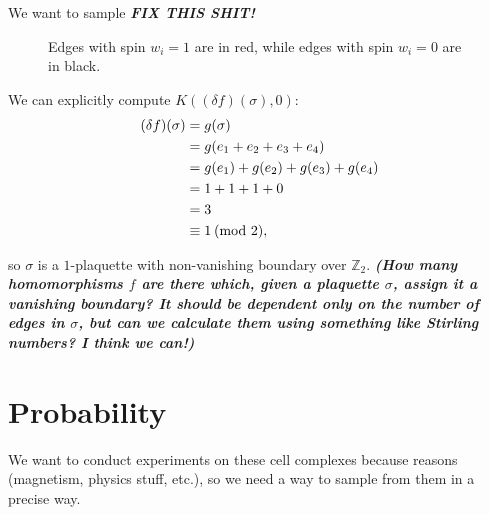 \documentclass[11pt]{article}
\theoremstyle{definition}
\newcommand{\Z}{\mathbb{Z}}			%
\newcommand{\Mod}[1]{\hspace{0.2em}(\mathrm{mod}\ #1)}	%
\newcommand{\question}[1]{{\color{brightlavender}\textit{\textbf{(#1)}}}}
\newcommand{\comment}[1]{{\color{bured}\textit{\textbf{#1}}}}
\begin{document}
	 	We want to sample \comment{FIX THIS SHIT!}
	 	
	 	\begin{figure*}[htpb!]
	 		\centering
	 		\caption*{Edges with spin $w_i=1$ are in {\color{bured} red}, while edges with spin $w_i=0$ are in black.}
	 	\end{figure*}
	 	
	 	We can explicitly compute $K((\delta f)(\sigma), 0)$:
	 	\begin{align*}
	 		(\delta f)(\sigma) &= g(\sigma) \\
	 		&= g(e_1 + e_2 + e_3 + e_4) \\
	 		&= g(e_1) + g(e_2) + g(e_3) + g(e_4) \\
	 		&= 1 + 1 + 1 + 0 \\
	 		&= 3 \\
	 		&\equiv 1 \Mod 2,
	 	\end{align*}
	 	
	 	so $\sigma$ is a $1$-plaquette with non-vanishing boundary over $\Z_2$. \question{How many homomorphisms $f$ are there which, given a plaquette $\sigma$, assign it a vanishing boundary? It should be dependent only on the number of edges in $\sigma$, but can we calculate them using something like Stirling numbers? I think we can!}

 	
 	\section*{Probability}
 		We want to conduct experiments on these cell complexes because reasons (magnetism, physics stuff, etc.), so we need a way to sample from them in a precise way.
 		
\end{document}
